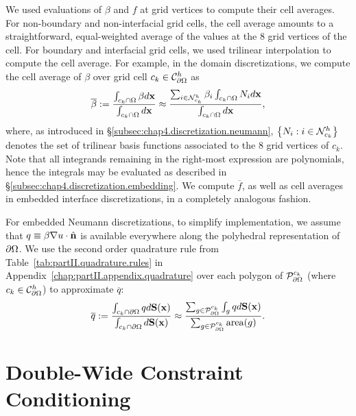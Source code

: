 We used evaluations of $\beta$ and $f$ at grid vertices to compute their cell averages. For non-boundary and non-interfacial grid cells, the cell average amounts to a straightforward, equal-weighted average of the values at the $8$ grid vertices of the cell. For boundary and interfacial grid cells, we used trilinear interpolation to compute the cell average. For example, in the domain discretizations, we compute the cell average of $\beta$ over grid cell $c_k \in \mathcal{C}^h_{\partial\Omega}$ as
\begin{equation*}
\overline{\beta} := \frac{\int_{c_k \cap \Omega} \beta d\mathbf{x}}{\int_{c_k \cap \Omega} d\mathbf{x}} \approx \frac{\sum_{i \in \mathcal{N}^h_{c_k}} \beta_i \int_{c_k \cap \Omega} N_i d\mathbf{x}}{\int_{c_k \cap \Omega} d\mathbf{x}},
\end{equation*}
where, as introduced in \S\ref{subsec:chap4.discretization.neumann}, $\left\lbrace  N_i : i \in \mathcal{N}^h_{c_k}  \right\rbrace$ denotes the set of trilinear basis functions associated to the $8$ grid vertices of $c_k$. Note that all integrands remaining in the right-most expression are polynomials, hence the integrals may be evaluated as described in \S\ref{subsec:chap4.discretization.embedding}. We compute $\overline{f}$, as well as cell averages in embedded interface discretizations, in a completely analogous fashion.

For embedded Neumann discretizations, to simplify implementation, we assume that $q \equiv \beta \nabla u \cdot \hat{\mathbf{n}}$ is available everywhere along the polyhedral representation of $\partial\Omega$. We use the second order quadrature rule from Table~\ref{tab:partII.quadrature.rules} in Appendix~\ref{chap:partII.appendix.quadrature} over each polygon of $\mathcal{P}^{c_k}_{\partial\Omega}$ (where $c_k \in \mathcal{C}^h_{\partial\Omega}$) to approximate $\overline{q}$:
\begin{equation*}
\overline{q} := \frac{\int_{c_k \cap \partial\Omega} q d\mathbf{S}(\mathbf{x})}{\int_{c_k \cap \partial\Omega} d\mathbf{S}(\mathbf{x})} \approx \frac{\sum_{g \in \mathcal{P}^{c_k}_{\partial\Omega}} \int_g q d\mathbf{S}(\mathbf{x})}{\sum_{g \in \mathcal{P}^{c_k}_{\partial\Omega}} \operatorname{area}(g)}.
\end{equation*}

\chapter{Double-Wide Constraint Conditioning} \label{chap:partII.appendix.constraintconditioning}

